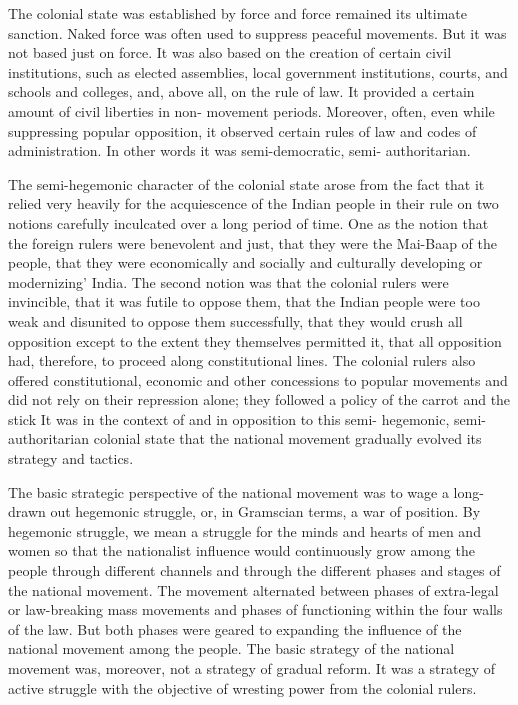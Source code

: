 \begin{multicols}{2}
The colonial state was established by force and force remained its ultimate sanction. Naked force was often used to suppress peaceful movements. But it was not based just on force. It was also based on the creation of certain civil institutions, such as elected assemblies, local government institutions, courts, and schools and colleges, and, above all, on the rule of law. It provided a certain amount of civil liberties in non- movement periods. Moreover, often, even while suppressing popular opposition, it observed certain rules of law and codes of administration. In other words it was semi-democratic, semi- authoritarian.

The semi-hegemonic character of the colonial state arose from the fact that it relied very heavily for the acquiescence of the Indian people in their rule on two notions carefully inculcated over a long period of time. One as the notion that the foreign rulers were benevolent and just, that they were the Mai-Baap of the people, that they were economically and socially and culturally developing or modernizing' India. The second notion was that the colonial rulers were invincible, that it was futile to oppose them, that the Indian people were too weak and disunited to oppose them successfully, that they would crush all opposition except to the extent they themselves permitted it, that all opposition had, therefore, to proceed along constitutional lines. The colonial rulers also offered constitutional, economic and other concessions to popular movements and did not rely on their repression alone; they followed a policy of the carrot and the stick It was in the context of and in opposition to this semi- hegemonic, semi-authoritarian colonial state that the national movement gradually evolved its strategy and tactics.

The basic strategic perspective of the national movement was to wage a long-drawn out hegemonic struggle, or, in Gramscian terms, a war of position. By hegemonic struggle, we mean a struggle for the minds and hearts of men and women so that the nationalist influence would continuously grow among the people through different channels and through the different phases and stages of the national movement. The movement alternated between phases of extra-legal or law-breaking mass movements and phases of functioning within the four walls of the law. But both phases were geared to expanding the influence of the national movement among the people. The basic strategy of the national movement was, moreover, not a strategy of gradual reform. It was a strategy of active struggle with the objective of wresting power from the colonial rulers.


\end{multicols}
